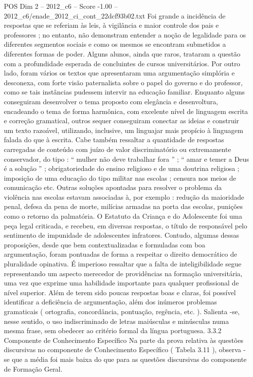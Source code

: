\begin{textsample}{POS Dim 2 – 2012\_c6 – Score -1.00 – 2012\_c6/enade\_2012\_ci\_cont\_22dcf93b02.txt}
Foi grande a incidência de respostas que se referiam às leis, à vigilância e maior controle dos pais e professores ; no entanto, não demonstram entender a noção de legalidade para os diferentes segmentos sociais e como os mesmos se encontram submetidos a diferentes formas de poder.
Alguns alunos, ainda que raros, trataram a questão com a profundidade esperada de concluintes de cursos universitários.
Por outro lado, foram vários os textos que apresentaram uma argumentação simplória e desconexa, com forte visão paternalista sobre o papel do governo e do professor, como se tais instâncias pudessem intervir na educação familiar.
Enquanto alguns conseguiram desenvolver o tema proposto com elegância e desenvoltura, encadeando o tema de forma harmônica, com excelente nível de linguagem escrita e correção gramatical, outros sequer conseguiram conectar as ideias e construir um texto razoável, utilizando, inclusive, um linguajar mais propício à linguagem falada do que à escrita.
Cabe também ressaltar a quantidade de respostas carregadas de conteúdo com juízo de valor discriminatório ou extremamente conservador, do tipo : “ mulher não deve trabalhar fora ” ; “ amar e temer a Deus é a solução ” ; obrigatoriedade do ensino religioso e de uma doutrina religiosa ; imposição de uma educação do tipo militar nas escolas ; censura nos meios de comunicação etc.
Outras soluções apontadas para resolver o problema da violência nas escolas estavam associadas à, por exemplo : redução da maioridade penal, defesa da pena de morte, milícias armadas na porta das escolas, punições como o retorno da palmatória.
O Estatuto da Criança e do Adolescente foi uma peça legal criticada, e recebeu, em diversas respostas, o título de responsável pelo sentimento de impunidade de adolescentes infratores.
Contudo, algumas dessas proposições, desde que bem contextualizadas e formuladas com boa argumentação, foram pontuadas de forma a respeitar o direito democrático de pluralidade opinativa.
É imperioso ressaltar que a falta de inteligibilidade segue representando um aspecto merecedor de providências na formação universitária, uma vez que exprime uma habilidade importante para qualquer profissional de nível superior.
Além de terem sido poucas respostas boas e claras, foi possível identificar a deficiência de argumentação, além dos inúmeros problemas gramaticais ( ortografia, concordância, pontuação, regência, etc. ).
Salienta -se, nesse sentido, o uso indiscriminado de letras maiúsculas e minúsculas numa mesma frase, sem obedecer ao critério formal da língua portuguesa. 3.3.2 Componente de Conhecimento Específico Na parte da prova relativa às questões discursivas no componente de Conhecimento Específico ( Tabela 3.11 ), observa -se que a média foi mais baixa do que para as questões discursivas do componente de Formação Geral.

\end{textsample}
